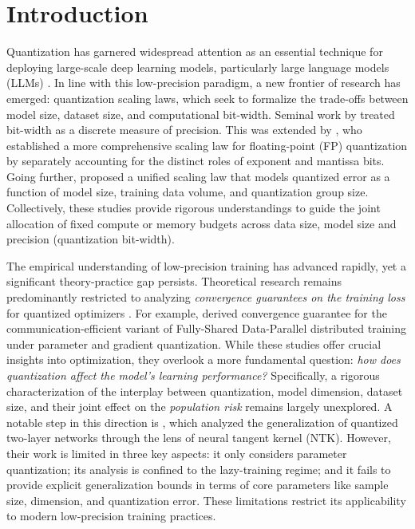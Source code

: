 \documentclass[11pt, letterpaper]{article}
\begin{document}
\section{Introduction}
Quantization has garnered widespread attention as an essential technique for deploying large-scale deep learning models, particularly large language models (LLMs) \citep{lang2024comprehensive,shen2024exploring}. In line with this low-precision paradigm, a new frontier of research has emerged: quantization scaling laws, which seek to formalize the trade-offs between model size, dataset size, and computational bit-width. Seminal work by \citet{kumar2024scaling} treated bit-width as a discrete measure of precision. This was extended by \citet{sun2025scaling}, who established a more comprehensive scaling law for floating-point (FP) quantization \citep{kuzmin2022fp8} by separately accounting for the distinct roles of exponent and mantissa bits. Going further, \citet{chen2025scaling} proposed a unified scaling law that models quantized error as a function of model size, training data volume, and quantization group size. Collectively, these studies provide rigorous understandings to guide the joint allocation of fixed compute or memory budgets across data size, model size and precision (quantization bit-width).

The empirical understanding of low-precision training has advanced rapidly, yet a significant theory-practice gap persists. Theoretical research remains predominantly restricted to analyzing \textit{convergence guarantees on the training loss} for quantized optimizers \citep{nadiradze2021asynchronous,9834296,markov2023quantized,xin2025global}. For example, \citet{markov2023quantized} derived convergence guarantee for the communication-efficient variant of Fully-Shared Data-Parallel distributed training under parameter and gradient quantization.
While these studies offer crucial insights into optimization, they overlook a more fundamental question: \textit{how does quantization affect the model's learning performance?} Specifically, a rigorous characterization of the interplay between quantization, model dimension, dataset size, and their joint effect on the \textit{population risk} remains largely unexplored. A notable step in this direction is \citet{zhang2022quantization}, which analyzed the generalization of quantized two-layer networks through the lens of neural tangent kernel (NTK). However, their work is limited in three key aspects: it only considers parameter quantization; its analysis is confined to the lazy-training regime; and it fails to provide explicit generalization bounds in terms of core parameters like sample size, dimension, and quantization error. These limitations restrict its applicability to modern low-precision training practices. 
\end{document}
